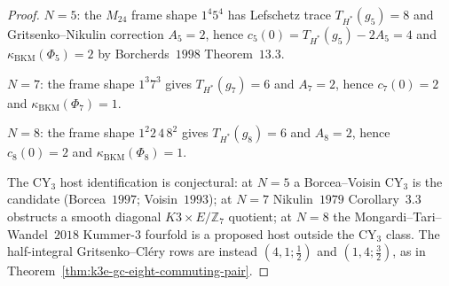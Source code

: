 \begin{proof}
$N=5$: the $M_{24}$ frame shape $1^4 5^4$ has Lefschetz trace
$T_{H^*}(g_5)=8$ and Gritsenko--Nikulin correction $A_5=2$, hence
$c_5(0)=T_{H^*}(g_5)-2A_5=4$ and
$\kappa_{\mathrm{BKM}}(\Phi_5)=2$ by Borcherds~$1998$ Theorem~$13.3$.

$N=7$: the frame shape $1^3 7^3$ gives $T_{H^*}(g_7)=6$ and
$A_7=2$, hence $c_7(0)=2$ and $\kappa_{\mathrm{BKM}}(\Phi_7)=1$.

$N=8$: the frame shape $1^2 2\,4\,8^2$ gives $T_{H^*}(g_8)=6$ and
$A_8=2$, hence $c_8(0)=2$ and $\kappa_{\mathrm{BKM}}(\Phi_8)=1$.

The CY$_3$ host identification is conjectural: at $N=5$ a
Borcea--Voisin CY$_3$ is the candidate (Borcea~$1997$; Voisin~$1993$);
at $N=7$ Nikulin~$1979$ Corollary~$3.3$ obstructs a smooth diagonal
$K3 \times E/\mathbb Z_7$ quotient; at $N=8$ the
Mongardi--Tari--Wandel~$2018$ Kummer-$3$ fourfold is a proposed host
outside the CY$_3$ class. The half-integral Gritsenko--Cl\'ery rows
are instead $(4,1;\tfrac12)$ and $(1,4;\tfrac32)$, as in
Theorem~\ref{thm:k3e-gc-eight-commuting-pair}.
\end{proof}

